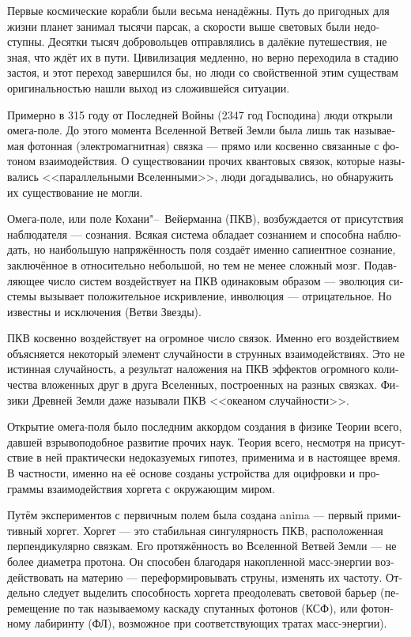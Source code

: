\documentclass[a4paper,12pt,fleqn]{book}\usepackage{cooltooltips}\usepackage{polyglossia}\setdefaultlanguage[babelshorthands=true]{russian}\setotherlanguage{english}\defaultfontfeatures{Ligatures=TeX,Mapping=tex-text} \usepackage{xcolor}\definecolor{lightgray}{HTML}{bbbbbb}\color{lightgray}\newcommand{\ml}[3]{\textenglish{\textcolor{black}{#3}}}
\begin{document}
{Первые космические корабли были весьма ненадёжны.
Путь до пригодных для жизни планет занимал тысячи парсак, а скорости выше световых были недоступны.
Десятки тысяч добровольцев отправлялись в далёкие путешествия, не зная, что ждёт их в пути.
Цивилизация медленно, но верно переходила в стадию застоя, и этот переход завершился бы, но люди со свойственной этим существам оригинальностью нашли выход из сложившейся ситуации.

Примерно в 315 году от Последней Войны (2347 год Господина) люди открыли омега-поле.
До этого момента Вселенной Ветвей Земли была лишь так называемая фотонная (электромагнитная) связка --- прямо или косвенно связанные с фотоном взаимодействия.
О существовании прочих квантовых связок, которые назывались <<параллельными Вселенными>>, люди догадывались, но обнаружить их существование не могли.

Омега-поле, или поле Кохани"--~Вейерманна (ПКВ), возбуждается от присутствия наблюдателя --- сознания.
Всякая система обладает сознанием и способна наблюдать, но наибольшую напряжённость поля создаёт именно сапиентное сознание, заключённое в относительно небольшой, но тем не менее сложный мозг.
Подавляющее число систем воздействует на ПКВ одинаковым образом --- эволюция системы вызывает положительное искривление, инволюция --- отрицательное.
Но известны и исключения (Ветви Звезды).

ПКВ косвенно воздействует на огромное число связок.
Именно его воздействием объясняется некоторый элемент случайности в струнных взаимодействиях.
Это не истинная случайность, а результат наложения на ПКВ эффектов огромного количества вложенных друг в друга Вселенных, построенных на разных связках.
Физики Древней Земли даже называли ПКВ <<океаном случайности>>.

Открытие омега-поля было последним аккордом создания в физике Теории всего, давшей взрывоподобное развитие прочих наук.
Теория всего, несмотря на присутствие в ней практически недоказуемых гипотез, применима и в настоящее время.
В частности, именно на её основе созданы устройства для оцифровки и программы взаимодействия хоргета с окружающим миром.

Путём экспериментов с первичным полем была создана anima --- первый примитивный хоргет.
Хоргет --- это стабильная сингулярность ПКВ, расположенная перпендикулярно связкам.
Его протяжённость во Вселенной Ветвей Земли --- не более диаметра протона.
Он способен благодаря накопленной масс-энергии воздействовать на материю --- переформировывать струны, изменять их частоту.
Отдельно следует выделить способность хоргета преодолевать световой барьер (перемещение по так называемому каскаду спутанных фотонов (КСФ), или фотонному лабиринту (ФЛ), возможное при соответствующих тратах масс-энергии).

}
\end{document}
